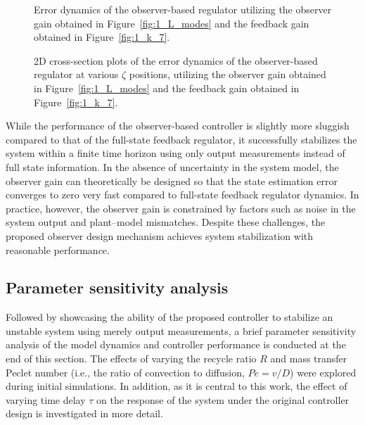 \begin{figure}[!htbp]
    \centering
    
    \caption{Error dynamics of the observer-based regulator utilizing the observer gain obtained in Figure~\ref{fig:1_L_modes} and the feedback gain obtained in Figure~\ref{fig:1_k_7}.}
    \label{fig:1_3D_e1_L_k7}
\end{figure}

\begin{figure}[!htbp]
    \centering
    
    \caption{2D cross-section plots of the error dynamics of the observer-based regulator at various $\zeta$ positions, utilizing the observer gain obtained in Figure~\ref{fig:1_L_modes} and the feedback gain obtained in Figure~\ref{fig:1_k_7}.}
    \label{fig:1_2D_et_L_k7}
\end{figure}

While the performance of the observer-based controller is slightly more sluggish compared to that of the full-state feedback regulator, it successfully stabilizes the system within a finite time horizon using only output measurements instead of full state information. In the absence of uncertainty in the system model, the observer gain can theoretically be designed so that the state estimation error converges to zero very fast compared to full-state feedback regulator dynamics. In practice, however, the observer gain is constrained by factors such as noise in the system output and plant--model mismatches. Despite these challenges, the proposed observer design mechanism achieves system stabilization with reasonable performance.

\subsection{Parameter sensitivity analysis}

Followed by showcasing the ability of the proposed controller to stabilize an unstable system using merely output measurements, a brief parameter sensitivity analysis of the model dynamics and controller performance is conducted at the end of this section. The effects of varying the recycle ratio $R$ and mass transfer Peclet number (i.e., the ratio of convection to diffusion, $Pe = v/D$) were explored during initial simulations. In addition, as it is central to this work, the effect of varying time delay $\tau$ on the response of the system under the original controller design is investigated in more detail.

